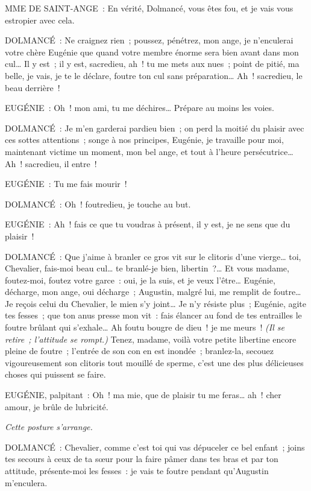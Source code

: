 \documentclass[french,twoside]{book} %
\begin{document}
MME DE SAINT-ANGE : En vérité, Dolmancé, vous êtes fou, et je vais vous estropier avec cela.\par
DOLMANCÉ : Ne craignez rien ; poussez, pénétrez, mon ange, je n’enculerai votre chère Eugénie que quand votre membre énorme sera bien avant dans mon cul… Il y est ; il y est, sacredieu, ah ! tu me mets aux nues ; point de pitié, ma belle, je vais, je te le déclare, foutre ton cul sans préparation… Ah ! sacredieu, le beau derrière !\par
EUGÉNIE : Oh ! mon ami, tu me déchires… Prépare au moins les voies.\par
DOLMANCÉ : Je m’en garderai pardieu bien ; on perd la moitié du plaisir avec ces sottes attentions ; songe à nos principes, Eugénie, je travaille pour moi, maintenant victime un moment, mon bel ange, et tout à l’heure persécutrice… Ah ! sacredieu, il entre !\par
EUGÉNIE : Tu me fais mourir !\par
DOLMANCÉ : Oh ! foutredieu, je touche au but.\par
EUGÉNIE : Ah ! fais ce que tu voudras à présent, il y est, je ne sens que du plaisir !\par
DOLMANCÉ : Que j’aime à branler ce gros vit sur le clitoris d’une vierge… toi, Chevalier, fais-moi beau cul… te branlé-je bien, libertin ?… Et vous madame, foutez-moi, foutez votre garce : oui, je la suis, et je veux l’être… Eugénie, décharge, mon ange, oui décharge ; Augustin, malgré lui, me remplit de foutre… Je reçois celui du Chevalier, le mien s’y joint… Je n’y résiste plus ; Eugénie, agite tes fesses ; que ton anus presse mon vit : fais élancer au fond de tes entrailles le foutre brûlant qui s’exhale… Ah foutu bougre de dieu ! je me meurs ! {\itshape (Il se retire ; l’attitude se rompt.)} Tenez, madame, voilà votre petite libertine encore pleine de foutre ; l’entrée de son con en est inondée ; branlez-la, secouez vigoureusement son clitoris tout mouillé de sperme, c’est une des plus délicieuses choses qui puissent se faire.\par
EUGÉNIE, palpitant : Oh ! ma mie, que de plaisir tu me feras… ah ! cher amour, je brûle de lubricité.\par
{\itshape Cette posture s’arrange.}\par
DOLMANCÉ : Chevalier, comme c’est toi qui vas dépuceler ce bel enfant ; joins tes secours à ceux de ta sœur pour la faire pâmer dans tes bras et par ton attitude, présente-moi les fesses : je vais te foutre pendant qu’Augustin m’enculera.\par
\end{document}
